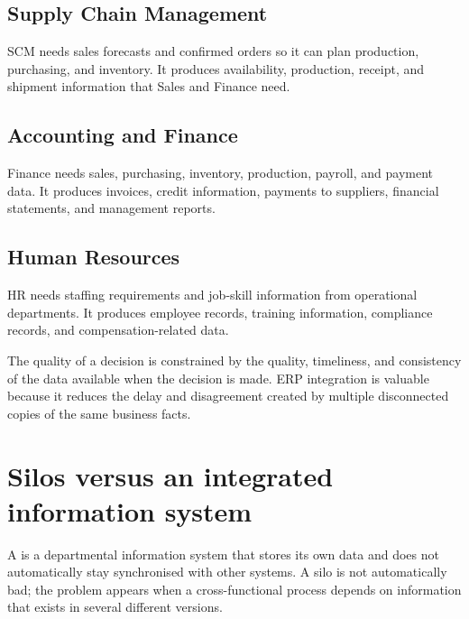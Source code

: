 \subsection{Supply Chain Management}
SCM needs sales forecasts and confirmed orders so it can plan production, purchasing, and inventory. It produces availability, production, receipt, and shipment information that Sales and Finance need.

\subsection{Accounting and Finance}
Finance needs sales, purchasing, inventory, production, payroll, and payment data. It produces invoices, credit information, payments to suppliers, financial statements, and management reports.

\subsection{Human Resources}
HR needs staffing requirements and job-skill information from operational departments. It produces employee records, training information, compliance records, and compensation-related data.

\begin{keyidea}
The quality of a decision is constrained by the quality, timeliness, and consistency of the data available when the decision is made. ERP integration is valuable because it reduces the delay and disagreement created by multiple disconnected copies of the same business facts.
\end{keyidea}

\section{Silos versus an integrated information system}

A  is a departmental information system that stores its own data and does not automatically stay synchronised with other systems. A silo is not automatically bad; the problem appears when a cross-functional process depends on information that exists in several different versions.

